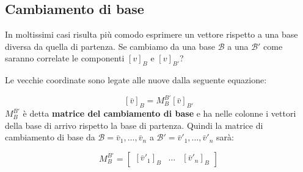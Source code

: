 \documentclass[x11names]{article}
\begin{document}
\subsection{Cambiamento di base}
In moltissimi casi risulta più comodo esprimere un vettore rispetto a una base diversa da quella di partenza. Se cambiamo da una base $\mathscr{B}$ a una $\mathscr{B}'$ come saranno correlate le componenti $\left[v\right]_{B}$ e $\left[v\right]_{B'}$?

\noindent
Le vecchie coordinate sono legate alle nuove dalla seguente equazione:

\[
\left[\bar{v}\right]_{B} = M_{B}^{B'} \left[\bar{v}\right]_{B'}
\] 
$M_{B}^{B'}$ è detta  \textbf{matrice del cambiamento di base} e ha nelle colonne i vettori della base di arrivo rispetto la base di partenza. Quindi la matrice di cambiamento di base da $\mathscr{B} = {\bar{v}_1,\dots,\bar{v}_{n}}$ a $\mathscr{B}' = {\bar{v}'_{1},\dots,\bar{v}'_{n}}$ sarà:


\[
M_{B}^{B'} =
\left[\begin{array}{c|c|c}
     \left[\bar{v}'_1\right]_{B}
&  \dots & \left[\bar{v}'_{n}\right]_{B}
\end{array}
\right]
\] 
\end{document}
